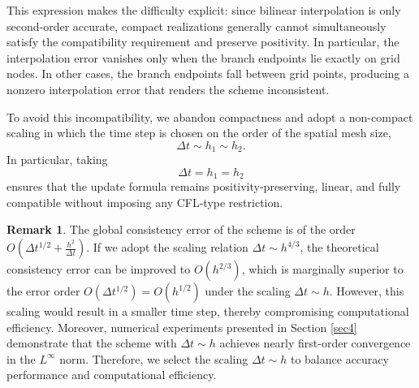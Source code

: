 \documentclass[11pt]{article}
\theoremstyle{mythm}
\theoremstyle{definition}
\newtheorem{remark}{Remark}
\begin{document}
	This expression makes the difficulty explicit: since bilinear interpolation is only second-order accurate, compact realizations generally cannot simultaneously satisfy the compatibility requirement and preserve positivity. In particular, the interpolation error vanishes only when the branch endpoints lie exactly on grid nodes. In other cases, the branch endpoints fall between grid points, producing a nonzero interpolation error that renders the scheme inconsistent.
	
	To avoid this incompatibility, we abandon compactness and adopt a non-compact scaling in which the time step is chosen on the order of the spatial mesh size,
	\[
	\Delta t \sim h_1 \sim h_2.
	\]
	In particular, taking
	\[
	\Delta t = h_1 = h_2
	\]
	ensures that the update formula remains positivity-preserving, linear, and fully compatible without imposing any CFL-type restriction. 
	
	\begin{remark}
		The global consistency error of the scheme is of the order $O\left(\Delta t^{1/2}+\frac{h^2}{\Delta t}\right)$. If we adopt the scaling relation $\Delta t \sim h^{4/3}$, the theoretical consistency error can be improved to $O(h^{2/3})$, which is marginally superior to the error order $O(\Delta t^{1/2}) = O(h^{1/2})$ under the scaling $\Delta t \sim h$. However, this scaling would result in a smaller time step, thereby compromising computational efficiency. Moreover, numerical experiments presented in Section \ref{sec4} demonstrate that the scheme with $\Delta t \sim h$ achieves nearly first-order convergence in the $L^\infty$ norm. Therefore, we select the scaling $\Delta t \sim h$ to balance accuracy performance and computational efficiency.
	\end{remark}
	
\end{document}
